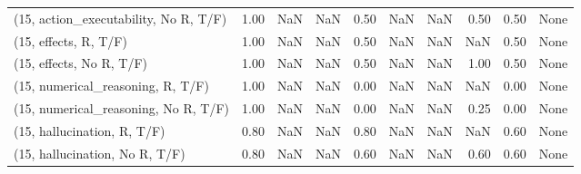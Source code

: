 \begin{table*}[h!]
\begin{adjustbox}{width=2\columnwidth,center}
\begin{tabular}{lrrr|rrr|rrr}
(15, action\_executability, No R, T/F) &                      1.00 &                   NaN &                       NaN &                          0.50 &                       NaN &                           NaN &                                   0.50 &                               0.50 &                                  None \\
(15, effects, R, T/F)                 &                      1.00 &                   NaN &                       NaN &                          0.50 &                       NaN &                           NaN &                                    NaN &                               0.50 &                                  None \\
(15, effects, No R, T/F)              &                      1.00 &                   NaN &                       NaN &                          0.50 &                       NaN &                           NaN &                                   1.00 &                               0.50 &                                  None \\
(15, numerical\_reasoning, R, T/F)     &                      1.00 &                   NaN &                       NaN &                          0.00 &                       NaN &                           NaN &                                    NaN &                               0.00 &                                  None \\
(15, numerical\_reasoning, No R, T/F)  &                      1.00 &                   NaN &                       NaN &                          0.00 &                       NaN &                           NaN &                                   0.25 &                               0.00 &                                  None \\
(15, hallucination, R, T/F)           &                      0.80 &                   NaN &                       NaN &                          0.80 &                       NaN &                           NaN &                                    NaN &                               0.60 &                                  None \\
(15, hallucination, No R, T/F)        &                      0.80 &                   NaN &                       NaN &                          0.60 &                       NaN &                           NaN &                                   0.60 &                               0.60 &                                  None \\

\end{tabular}
\end{adjustbox}
\end{table*}
